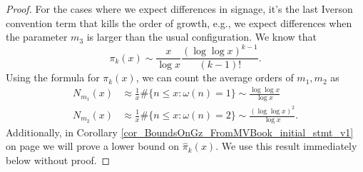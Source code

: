 \documentclass[11pt,reqno,a4letter]{article}
\numberwithin{figure}{section}
\numberwithin{table}{section}
\theoremstyle{plain}
\numberwithin{theorem}{section}
\theoremstyle{definition}
\begin{document}
\begin{proof}
For the cases where we expect differences in 
signage, it's the last Iverson convention term that kills the order of growth, e.g., we expect differences 
when the parameter $m_3$ is larger than the usual configuration. 
We know that 
\[
\pi_k(x) \sim \frac{x}{\log x} \frac{(\log\log x)^{k-1}}{(k-1)!}. 
\]
Using the formula for $\pi_k(x)$, we can count the average orders of $m_1,m_2$ as 
\begin{align*}
N_{m_1}(x) & \approx \frac{1}{x} \#\{n \leq x: \omega(n) = 1\} \sim \frac{\log\log x}{\log x} \\ 
N_{m_2}(x) & \approx \frac{1}{x} \#\{n \leq x: \omega(n) = 2\} \sim \frac{(\log\log x)^2}{\log x}. 
\end{align*} 
Additionally, in Corollary \ref{cor_BoundsOnGz_FromMVBook_initial_stmt_v1} on 
page \pageref{cor_BoundsOnGz_FromMVBook_initial_stmt_v1} 
we will prove a lower bound on $\widehat{\pi}_k(x)$. We use this result immediately 
below without proof. 


\end{proof}
\end{document}
